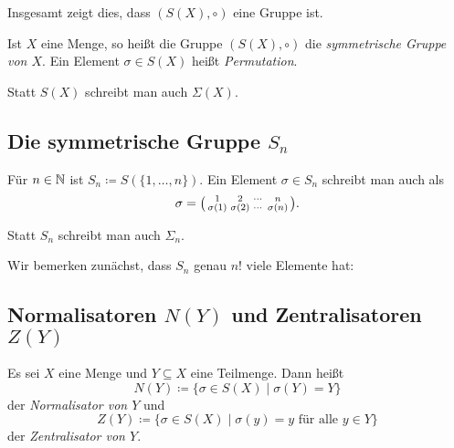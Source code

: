 Insgesamt zeigt dies, dass $(S(X), \circ)$ eine Gruppe ist.

\begin{defi}
 Ist $X$ eine Menge, so heißt die Gruppe $(S(X), \circ)$ die \emph{symmetrische Gruppe von $X$}. Ein Element $\sigma \in S(X)$ heißt \emph{Permutation}.
\end{defi}


\begin{bem}
 Statt $S(X)$ schreibt man auch $\Sigma(X)$.
\end{bem}


\subsection{Die symmetrische Gruppe \texorpdfstring{$S_n$}{Sn}}
Für $n \in \mathbb{N}$ ist $S_n \coloneqq S(\{1, \dotsc, n\})$. Ein Element $\sigma \in S_n$ schreibt man auch als
\[
 \sigma
 =
 \begin{psmallmatrix}
  1         & 2         & \cdots & n \\
  \sigma(1) & \sigma(2) & \cdots & \sigma(n)
 \end{psmallmatrix}.
\]

\begin{bem}
 Statt $S_n$ schreibt man auch $\Sigma_n$.
\end{bem}

Wir bemerken zunächst, dass $S_n$ genau $n!$ viele Elemente hat: 




\subsection{Normalisatoren \texorpdfstring{$N(Y)$}{N(Y)} und Zentralisatoren \texorpdfstring{$Z(Y)$}{Z(Y)}}


\begin{defi}
 Es sei $X$ eine Menge und $Y \subseteq X$ eine Teilmenge. Dann heißt
 \[
  N(Y) \coloneqq \{\sigma \in S(X) \mid \sigma(Y) = Y\}
 \]
 der \emph{Normalisator von $Y$} und
 \[
  Z(Y)
  \coloneqq
  \{\sigma \in S(X) \mid \text{$\sigma(y) = y$ für alle $y \in Y$}\}
 \]
 der \emph{Zentralisator von $Y$}.
\end{defi}

